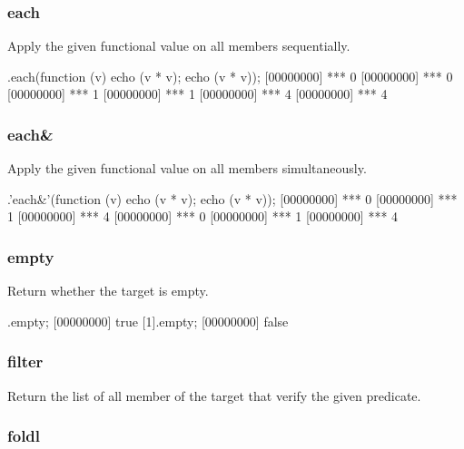 \subsubsection{each}

Apply the given functional value on all members sequentially.

\begin{urbiscript}[firstnumber=last]
[0, 1, 2].each(function (v) {echo (v * v); echo (v * v)});
[00000000] *** 0
[00000000] *** 0
[00000000] *** 1
[00000000] *** 1
[00000000] *** 4
[00000000] *** 4
\end{urbiscript}

\subsubsection{each\&}

Apply the given functional value on all members simultaneously.

\begin{urbiscript}[firstnumber=last]
[0, 1, 2].'each&'(function (v) {echo (v * v); echo (v * v)});
[00000000] *** 0
[00000000] *** 1
[00000000] *** 4
[00000000] *** 0
[00000000] *** 1
[00000000] *** 4
\end{urbiscript}

\subsubsection{empty}

Return whether the target is empty.

\begin{urbiscript}[firstnumber=last]
[].empty;
[00000000] true
[1].empty;
[00000000] false
\end{urbiscript}

\subsubsection{filter}

Return the list of all member of the target that verify the given
predicate.


\subsubsection{foldl}

